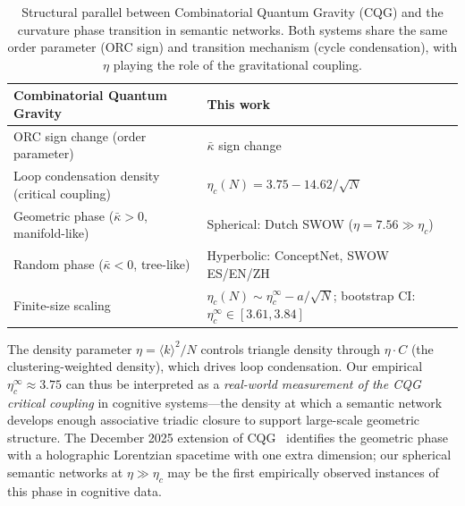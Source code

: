 \documentclass[11pt,a4paper]{article}
\newcommand{\kbar}{\bar{\kappa}}
\newcommand{\kavg}{\langle k \rangle}
\newcommand{\etac}{\eta_c}
\begin{document}
\begin{table}[h]
\centering
\small
\caption{Structural parallel between Combinatorial Quantum Gravity (CQG) and the curvature phase transition in semantic networks. Both systems share the same order parameter (ORC sign) and transition mechanism (cycle condensation), with $\eta$ playing the role of the gravitational coupling.}
\label{tab:cqg_parallel}
\begin{tabular}{@{}ll@{}}
\toprule
\textbf{Combinatorial Quantum Gravity} & \textbf{This work} \\
\midrule
ORC sign change (order parameter) & $\kbar$ sign change \\
Loop condensation density (critical coupling) & $\etac(N) = 3.75 - 14.62/\sqrt{N}$ \\
Geometric phase ($\kbar > 0$, manifold-like) & Spherical: Dutch SWOW ($\eta = 7.56 \gg \etac$) \\
Random phase ($\kbar < 0$, tree-like) & Hyperbolic: ConceptNet, SWOW ES/EN/ZH \\
Finite-size scaling & $\etac(N) \sim \etac^\infty - a/\sqrt{N}$; bootstrap CI: $\eta_c^\infty\in[3.61,3.84]$ \\
\bottomrule
\end{tabular}
\end{table}

The density parameter $\eta = \kavg^2/N$ controls triangle density through $\eta \cdot C$ (the clustering-weighted density), which drives loop condensation. Our empirical $\etac^\infty \approx 3.75$ can thus be interpreted as a \emph{real-world measurement of the CQG critical coupling} in cognitive systems---the density at which a semantic network develops enough associative triadic closure to support large-scale geometric structure. The December 2025 extension of CQG~\cite{trugenberger2025review} identifies the geometric phase with a holographic Lorentzian spacetime with one extra dimension; our spherical semantic networks at $\eta \gg \etac$ may be the first empirically observed instances of this phase in cognitive data.
\end{document}
